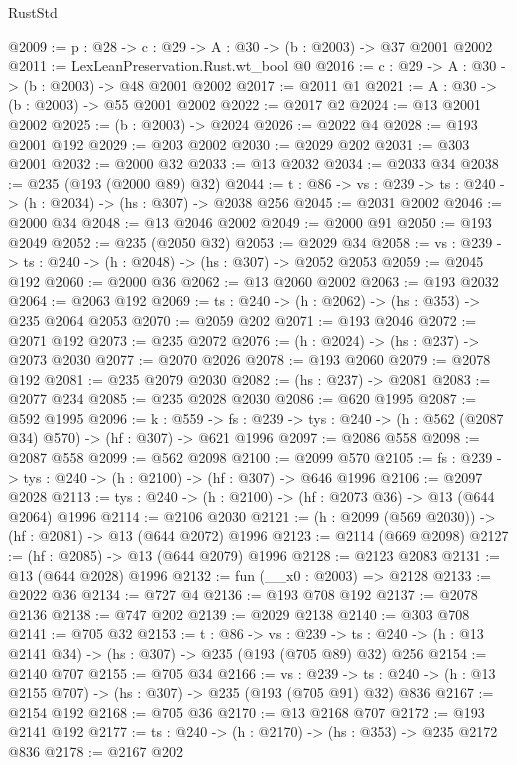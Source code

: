 \begin{lexlean}{RustStd}
\begin{coremodule}
{\begin{coremodule}
{{{{@2009 := {p : @28} -> {c : @29} -> {A : @30} -> (b : @2003) -> @37 @2001 @2002
@2011 := LexLeanPreservation.Rust.wt_bool @0
@2016 := {c : @29} -> {A : @30} -> (b : @2003) -> @48 @2001 @2002
@2017 := @2011 @1
@2021 := {A : @30} -> (b : @2003) -> @55 @2001 @2002
@2022 := @2017 @2
@2024 := @13 @2001 @2002
@2025 := (b : @2003) -> @2024
@2026 := @2022 @4
@2028 := @193 @2001 @192
@2029 := @203 @2002
@2030 := @2029 @202
@2031 := @303 @2001
@2032 := @2000 @32
@2033 := @13 @2032
@2034 := @2033 @34
@2038 := @235 (@193 (@2000 @89) @32)
@2044 := {t : @86} -> {vs : @239} -> {ts : @240} -> (h : @2034) -> (hs : @307) -> @2038 @256
@2045 := @2031 @2002
@2046 := @2000 @34
@2048 := @13 @2046 @2002
@2049 := @2000 @91
@2050 := @193 @2049
@2052 := @235 (@2050 @32)
@2053 := @2029 @34
@2058 := {vs : @239} -> {ts : @240} -> (h : @2048) -> (hs : @307) -> @2052 @2053
@2059 := @2045 @192
@2060 := @2000 @36
@2062 := @13 @2060 @2002
@2063 := @193 @2032
@2064 := @2063 @192
@2069 := {ts : @240} -> (h : @2062) -> (hs : @353) -> @235 @2064 @2053
@2070 := @2059 @202
@2071 := @193 @2046
@2072 := @2071 @192
@2073 := @235 @2072
@2076 := (h : @2024) -> (hs : @237) -> @2073 @2030
@2077 := @2070 @2026
@2078 := @193 @2060
@2079 := @2078 @192
@2081 := @235 @2079 @2030
@2082 := (hs : @237) -> @2081
@2083 := @2077 @234
@2085 := @235 @2028 @2030
@2086 := @620 @1995
@2087 := @592 @1995
@2096 := {k : @559} ->
  {fs : @239} -> {tys : @240} -> (h : @562 (@2087 @34) @570) -> (hf : @307) -> @621 @1996
@2097 := @2086 @558
@2098 := @2087 @558
@2099 := @562 @2098
@2100 := @2099 @570
@2105 := {fs : @239} -> {tys : @240} -> (h : @2100) -> (hf : @307) -> @646 @1996
@2106 := @2097 @2028
@2113 := {tys : @240} -> (h : @2100) -> (hf : @2073 @36) -> @13 (@644 @2064) @1996
@2114 := @2106 @2030
@2121 := (h : @2099 (@569 @2030)) -> (hf : @2081) -> @13 (@644 @2072) @1996
@2123 := @2114 (@669 @2098)
@2127 := (hf : @2085) -> @13 (@644 @2079) @1996
@2128 := @2123 @2083
@2131 := @13 (@644 @2028) @1996
@2132 := fun (__x0 : @2003) => @2128
@2133 := @2022 @36
@2134 := @727 @4
@2136 := @193 @708 @192
@2137 := @2078 @2136
@2138 := @747 @202
@2139 := @2029 @2138
@2140 := @303 @708
@2141 := @705 @32
@2153 := {t : @86} ->
  {vs : @239} ->
  {ts : @240} -> (h : @13 @2141 @34) -> (hs : @307) -> @235 (@193 (@705 @89) @32) @256
@2154 := @2140 @707
@2155 := @705 @34
@2166 := {vs : @239} ->
  {ts : @240} -> (h : @13 @2155 @707) -> (hs : @307) -> @235 (@193 (@705 @91) @32) @836
@2167 := @2154 @192
@2168 := @705 @36
@2170 := @13 @2168 @707
@2172 := @193 @2141 @192
@2177 := {ts : @240} -> (h : @2170) -> (hs : @353) -> @235 @2172 @836
@2178 := @2167 @202
}}}}
\end{coremodule}}
\end{coremodule}
\end{lexlean}
